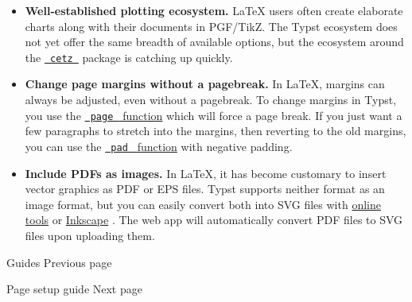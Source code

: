 \begin{itemize}
\item
  \textbf{Well-established plotting ecosystem.} LaTeX users often create
  elaborate charts along with their documents in PGF/TikZ. The Typst
  ecosystem does not yet offer the same breadth of available options,
  but the ecosystem around the
  \href{https://github.com/cetz-package/cetz}{\texttt{\ cetz\ }} package
  is catching up quickly.
\item
  \textbf{Change page margins without a pagebreak.} In LaTeX, margins
  can always be adjusted, even without a pagebreak. To change margins in
  Typst, you use the
  \href{/docs/reference/layout/page/}{\texttt{\ page\ } function} which
  will force a page break. If you just want a few paragraphs to stretch
  into the margins, then reverting to the old margins, you can use the
  \href{/docs/reference/layout/pad/}{\texttt{\ pad\ } function} with
  negative padding.
\item
  \textbf{Include PDFs as images.} In LaTeX, it has become customary to
  insert vector graphics as PDF or EPS files. Typst supports neither
  format as an image format, but you can easily convert both into SVG
  files with \href{https://cloudconvert.com/pdf-to-svg}{online tools} or
  \href{https://inkscape.org/}{Inkscape} . The web app will
  automatically convert PDF files to SVG files upon uploading them.
\end{itemize}

\href{/docs/guides/}{\pandocbounded{}}

{ Guides } { Previous page }

\href{/docs/guides/page-setup-guide/}{\pandocbounded{}}

{ Page setup guide } { Next page }


